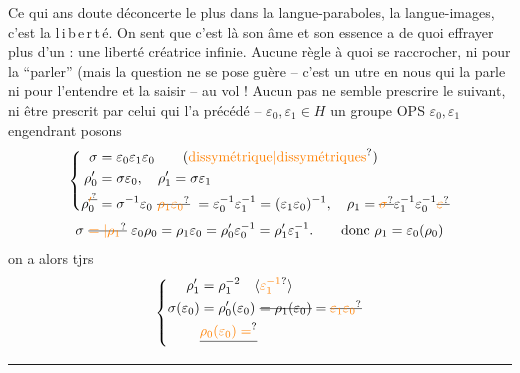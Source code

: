 Ce qui ans doute déconcerte le plus dans la langue-paraboles, la
langue-images, c'est la \mbox{l\,i\,b\,e\,r\,t\,é}. On sent que c'est là son âme et
son essence\handwritten{,}   a de quoi effrayer plus d'un : une liberté créatrice infinie.
Aucune règle à quoi se raccrocher, ni pour la ``parler'' (mais la
question ne se pose guère -- c'est  un  utre en nous qui la parle
ni pour l'entendre et la saisir -- au vol ! Aucun pas ne semble prescrire
le suivant, ni être prescrit par celui qui l'a précédé -- 
$\varepsilon_0,\varepsilon_1\in H$ un groupe OPS $\varepsilon_0,\varepsilon_1$ engendrant
posons
\[\left\{\begin{aligned}
\sigma&=\varepsilon_0\varepsilon_1\varepsilon_0\qquad\text{(\unsure{dissymétrique|dissymétriques})}\\
\rho'_0&=\sigma \varepsilon_0,\quad \rho'_1=\sigma \varepsilon_1\\
\rho_0^{\deleted{\unsure{\prime}}}&=\sigma^{-1}\varepsilon_0\ \deleted{\unsure{\rho_1\varepsilon_0}}\ =\varepsilon_0^{-1}\varepsilon_1^{-1}=(\varepsilon_1\varepsilon_0)^{-1},\quad \rho_1=\deleted{\unsure{\sigma}}\varepsilon_1^{-1}\varepsilon_0^{-1}\deleted{\unsure{\varepsilon}}
\end{aligned}\right.\]
\[\sigma\ \deleted{\unsure{=|\rho_1}}\ \varepsilon_0\rho_0=\rho_1\varepsilon_0=\rho'_0\varepsilon_0^{-1}=\rho'_1\varepsilon_1^{-1}.\qquad\text{donc }\rho_1=\varepsilon_0(\rho_0)\]
on a alors tjrs
\[\left\{\begin{aligned}
\rho'_1&=\rho_1^{-2}\quad\inserted{\unsure{\varepsilon_1^{-1}}}\\
\sigma(\varepsilon_0)&=\rho'_0(\varepsilon_0)\ \deleted{=\rho_1(\varepsilon_0)}=\deleted{\unsure{\varepsilon_1\varepsilon_0}}\\
&\deleted{\unsure{\rho_0(\varepsilon_0)=}}
\end{aligned}\right.\]
\noindent\rule{\linewidth}{.4pt}

